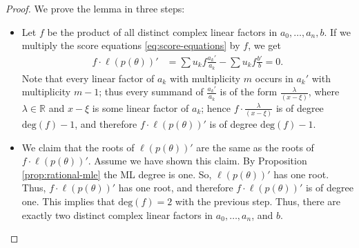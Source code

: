 \begin{proof}
    We prove the lemma in three steps:
    \begin{itemize}
        \item Let \( f \) be the product of all distinct complex linear factors in \( a_0, \dots, a_n, b \).  If we multiply the score equations \eqref{eq:score-equations} by \( f \), we get 
        \begin{align*}
            f \cdot \ell(p(\theta))' &= \sum u_k f \frac{a_k'}{a_k} - \sum u_k f \frac{b'}{b} = 0. 
        \end{align*}
        Note that every linear factor of \( a_k \) with multiplicity \( m \) occurs in \( a_k' \) with multiplicity \( m-1 \); thus every summand of \( \frac{a_k'}{a_k} \) is of the form \( \frac{\lambda}{(x-\xi)} \), where \( \lambda \in \mathbb{R} \) and \( x-\xi \) is some linear factor of \( a_k \); hence \( f \cdot  \frac{\lambda}{(x-\xi)}  \) is of degree \( \mathrm{deg}(f) - 1\), and therefore \( f \cdot \ell(p(\theta))' \) is of degree \( \mathrm{deg}(f) - 1\).

        \item We claim that the roots of \( \ell(p(\theta))' \) are the same as the roots of \( f \cdot \ell(p(\theta))' \). Assume we have shown this claim.  By Proposition \ref{prop:rational-mle} the ML degree is one. So, \( \ell(p(\theta))' \) has one root. Thus, \( f \cdot \ell(p(\theta))' \) has one root, and therefore \( f \cdot \ell(p(\theta))' \) is of degree one. This implies that \( \mathrm{deg}(f) = 2 \) with the previous step. Thus, there are exactly two distinct complex linear factors in \( a_0, \dots, a_n \), and \( b \).
        

\end{itemize}
\end{proof}
